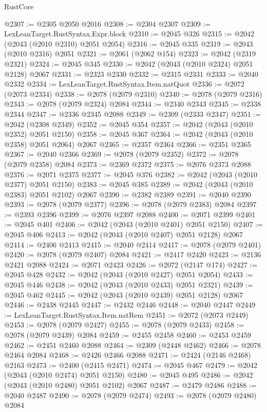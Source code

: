 \begin{lexlean}{RustCore}
\begin{coremodule}
@2307 := @2305 @2050 @2016
@2308 := @2304 @2307
@2309 := LexLeanTarget.RustSyntax.Expr.block
@2310 := @2045 @326
@2315 := @2042 (@2043 (@2010 @2310) @2051 @2054)
@2316 := @2045 @335
@2319 := @2043 (@2010 @2316) @2051
@2321 := @2061 (@2062 @154)
@2323 := @2042 (@2319 @2321)
@2324 := @2045 @345
@2330 := @2042 (@2043 (@2010 @2324) @2051 @2128) @2067
@2331 := @2323 @2330
@2332 := @2315 @2331
@2333 := @2040 @2332
@2334 := LexLeanTarget.RustSyntax.Item.natQuot
@2336 := @2072 (@2073 @2334)
@2338 := @2078 (@2079 @2310)
@2340 := @2078 (@2079 @2316)
@2343 := @2078 (@2079 @2324) @2084
@2344 := @2340 @2343
@2345 := @2338 @2344
@2347 := @2336 @2345 @2088
@2349 := @2309 (@2333 @2347)
@2351 := @2042 (@2308 @2349)
@2352 := @2045 @354
@2357 := @2042 (@2043 (@2010 @2352) @2051 @2150)
@2358 := @2045 @367
@2364 := @2042 (@2043 (@2010 @2358) @2051 @2064) @2067
@2365 := @2357 @2364
@2366 := @2351 @2365
@2367 := @2040 @2366
@2369 := @2078 (@2079 @2352)
@2372 := @2078 (@2079 @2358) @2084
@2373 := @2369 @2372
@2375 := @2076 @2373 @2088
@2376 := @2071 @2375
@2377 := @2045 @376
@2382 := @2042 (@2043 (@2010 @2377) @2051 @2150)
@2383 := @2045 @385
@2389 := @2042 (@2043 (@2010 @2383) @2051 @2102) @2067
@2390 := @2382 @2389
@2391 := @2040 @2390
@2393 := @2078 (@2079 @2377)
@2396 := @2078 (@2079 @2383) @2084
@2397 := @2393 @2396
@2399 := @2076 @2397 @2088
@2400 := @2071 @2399
@2401 := @2045 @401
@2406 := @2042 (@2043 (@2010 @2401) @2051 @2150)
@2407 := @2045 @406
@2413 := @2042 (@2043 (@2010 @2407) @2051 @2128) @2067
@2414 := @2406 @2413
@2415 := @2040 @2414
@2417 := @2078 (@2079 @2401)
@2420 := @2078 (@2079 @2407) @2084
@2421 := @2417 @2420
@2423 := @2136 @2421 @2088
@2424 := @2071 @2423
@2426 := @2072 (@2147 @174)
@2427 := @2045 @428
@2432 := @2042 (@2043 (@2010 @2427) @2051 @2054)
@2433 := @2045 @446
@2438 := @2042 (@2043 (@2010 @2433) @2051 @2321)
@2439 := @2045 @462
@2445 := @2042 (@2043 (@2010 @2439) @2051 @2128) @2067
@2446 := @2438 @2445
@2447 := @2432 @2446
@2448 := @2040 @2447
@2449 := LexLeanTarget.RustSyntax.Item.natRem
@2451 := @2072 (@2073 @2449)
@2453 := @2078 (@2079 @2427)
@2455 := @2078 (@2079 @2433)
@2458 := @2078 (@2079 @2439) @2084
@2459 := @2455 @2458
@2460 := @2453 @2459
@2462 := @2451 @2460 @2088
@2464 := @2309 (@2448 @2462)
@2466 := @2078 @2464 @2084
@2468 := @2426 @2466 @2088
@2471 := @2424 (@2146 @2468) @2163
@2473 := @2400 (@2415 @2471)
@2474 := @2045 @467
@2479 := @2042 (@2043 (@2010 @2474) @2051 @2150)
@2480 := @2045 @495
@2486 := @2042 (@2043 (@2010 @2480) @2051 @2102) @2067
@2487 := @2479 @2486
@2488 := @2040 @2487
@2490 := @2078 (@2079 @2474)
@2493 := @2078 (@2079 @2480) @2084

\end{coremodule}
\end{lexlean}
